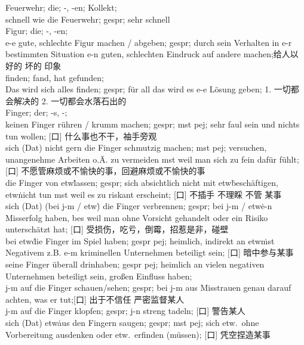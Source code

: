 \noindent
Feuerwehr; die; -, -en; Kollekt; \\
schnell wie die Feuerwehr; gespr; sehr schnell \\

\noindent
Figur; die; -, -en; \\
e-e gute, schlechte Figur machen / abgeben; gespr; durch sein Verhalten in e-r bestimmten Situation e-n guten, schlechten Eindruck auf andere machen;给人以好的 坏的 印象 \\

\noindent
finden; fand, hat gefunden; \\
Das wird sich alles finden; gespr; f\"ur all das wird es e-e L\"osung geben; 1. 一切都会解决的 2. 一切都会水落石出的\\

\noindent
Finger; der; -s, -;\\
keinen Finger r\"uhren / krumm machen; gespr; mst pej; sehr faul sein und nichts tun wollen; [口] 什么事也不干，袖手旁观\\
sich (Dat) nicht gern die Finger schmutzig machen; mst pej; versuchen, unangenehme Arbeiten o.\"A. zu vermeiden mst weil man sich zu fein daf\"ur f\"uhlt; [口] 不愿管麻烦或不愉快的事，回避麻烦或不愉快的事\\
die Finger von etw\. lassen; gespr; sich absichtlich nicht mit etw\. besch\"aftigen, etw\. nicht tun mst weil es zu riskant erscheint; [口] 不插手 不理睬 不管 某事\\
sich (Dat) (bei j-m / etw\.) die Finger verbrennen; gespr; bei j-m / etw\. e-n Misserfolg haben, bes weil man ohne Vorsicht gehandelt oder ein Risiko untersch\"atzt hat; [口] 受损伤，吃亏，倒霉，招惹是非，碰壁 \\
bei etw\. die Finger im Spiel haben; gespr pej; heimlich, indirekt an etw\. mst Negativem z.B. e-m kriminellen Unternehmen beteiligt sein; [口] 暗中参与某事\\ 
seine Finger \"uberall drinhaben; gespr pej; heimlich an vielen negativen Unternehmen beteiligt sein, gro\ss{}en Einfluss haben; \\
j-m auf die Finger schauen/sehen; gespr; bei j-m aus Misstrauen genau darauf achten, was er tut;[口] 出于不信任 严密监督某人 \\
j-m auf die Finger klopfen; gespr; j-n streng tadeln; [口] 警告某人\\
sich (Dat) etw\. aus den Fingern saugen; gespr; mst pej; sich etw.\ ohne Vorbereitung ausdenken oder etw.\ erfinden (m\"ussen); [口] 凭空捏造某事\\
